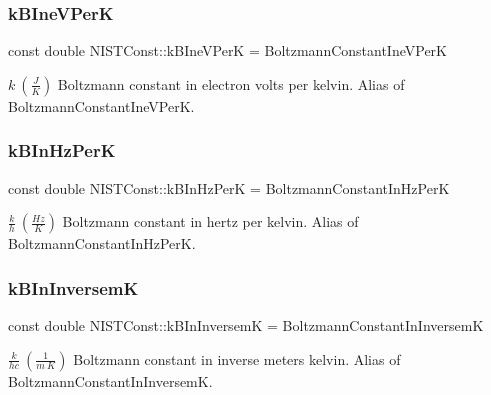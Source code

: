 \subsubsection{\texorpdfstring{k\+B\+Ine\+V\+PerK}{kBIneVPerK}}
{\footnotesize\ttfamily const double N\+I\+S\+T\+Const\+::k\+B\+Ine\+V\+PerK = Boltzmann\+Constant\+Ine\+V\+PerK}

$k \ (\frac{J}{K})$ Boltzmann constant in electron volts per kelvin. Alias of Boltzmann\+Constant\+Ine\+V\+PerK. \mbox{\label{group___boltzmann_constant_gaa7a3aa5798c9617d09120f8041c93433}} 
\subsubsection{\texorpdfstring{k\+B\+In\+Hz\+PerK}{kBInHzPerK}}
{\footnotesize\ttfamily const double N\+I\+S\+T\+Const\+::k\+B\+In\+Hz\+PerK = Boltzmann\+Constant\+In\+Hz\+PerK}

$\frac{k}{h} \ (\frac{Hz}{K})$ Boltzmann constant in hertz per kelvin. Alias of Boltzmann\+Constant\+In\+Hz\+PerK. \mbox{\label{group___boltzmann_constant_ga54bf445c848dc6dc425076bf6ab45d83}} 
\subsubsection{\texorpdfstring{k\+B\+In\+InversemK}{kBInInversemK}}
{\footnotesize\ttfamily const double N\+I\+S\+T\+Const\+::k\+B\+In\+InversemK = Boltzmann\+Constant\+In\+InversemK}

$\frac{k}{h c} \ (\frac{1}{m\ K})$ Boltzmann constant in inverse meters kelvin. Alias of Boltzmann\+Constant\+In\+InversemK. 